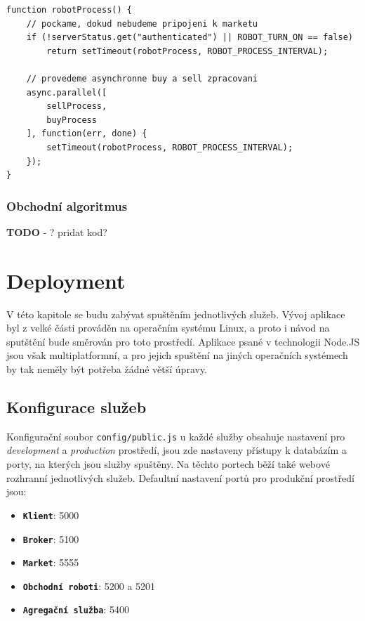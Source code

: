 \documentclass[thesis=M,czech]{FITthesis}[2012/06/26]
\begin{document}
\begin{lstlisting}[basicstyle={\tiny\ttfamily}, frame=single] 	
function robotProcess() {
    // pockame, dokud nebudeme pripojeni k marketu
    if (!serverStatus.get("authenticated") || ROBOT_TURN_ON == false)
        return setTimeout(robotProcess, ROBOT_PROCESS_INTERVAL);

    // provedeme asynchronne buy a sell zpracovani
    async.parallel([
        sellProcess,
        buyProcess
    ], function(err, done) {
        setTimeout(robotProcess, ROBOT_PROCESS_INTERVAL);
    });
}
\end{lstlisting}

	
\subsection{Obchodní algoritmus}
\textbf{TODO} - ? pridat kod?



\chapter{Deployment}
\label{chap:deploy}
	V této kapitole se budu zabývat spuštěním jednotlivých služeb. Vývoj aplikace byl z velké části prováděn na operačním systému Linux, a proto i návod na sputštění bude směrován pro toto prostředí. Aplikace psané v technologii Node.JS jsou však multiplatformní, a pro jejich spuštění na jiných operačních systémech by tak neměly být potřeba žádné větší úpravy.

\section{Konfigurace služeb}
\label{sec:ports}

	Konfigurační soubor \texttt{config/public.js} u každé služby obsahuje nastavení pro \textit{development} a \textit{production} prostředí, jsou zde nastaveny přístupy k databázím a porty, na kterých jsou služby spuštěny. Na těchto portech běží také webové rozhranní jednotlivých služeb. Defaultní nastavení portů pro produkční prostředí jsou:

\begin{itemize}

\item \textbf{\texttt{Klient}}: 5000

\item \textbf{\texttt{Broker}}: 5100

\item \textbf{\texttt{Market}}: 5555

\item \textbf{\texttt{Obchodní roboti}}: 5200 a 5201

\item \textbf{\texttt{Agregační služba}}: 5400

\end{itemize}
\end{document}
